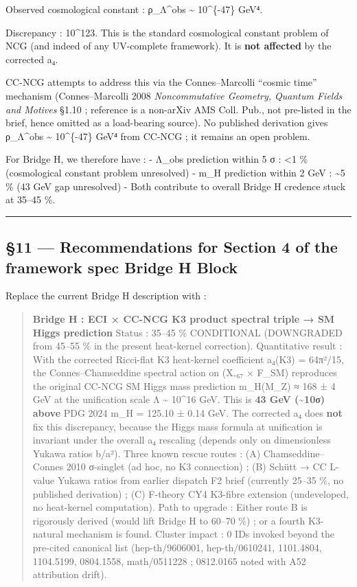 \documentclass[
  11pt,
  a4paper,
]{article}
\begin{document}
Observed cosmological constant : ρ\_Λ\^{}obs \textasciitilde{} 10\^{}\{-47\} GeV⁴.

Discrepancy : 10\^{}123. This is the standard cosmological constant problem of NCG (and indeed of any UV-complete framework). It is \textbf{not affected} by the corrected a₄.

CC-NCG attempts to address this via the Connes--Marcolli ``cosmic time'' mechanism (Connes--Marcolli 2008 \emph{Noncommutative Geometry, Quantum Fields and Motives} §1.10 ; reference is a non-arXiv AMS Coll. Pub., not pre-listed in the brief, hence omitted as a load-bearing source). No published derivation gives ρ\_Λ\^{}obs \textasciitilde{} 10\^{}\{-47\} GeV⁴ from CC-NCG ; it remains an open problem.

For Bridge H, we therefore have :
- Λ\_obs prediction within 5 σ : \textless1 \% (cosmological constant problem unresolved)
- m\_H prediction within 2 GeV : \textasciitilde5 \% (43 GeV gap unresolved)
- Both contribute to overall Bridge H credence stuck at 35--45 \%.

\begin{center}\rule{0.5\linewidth}{0.5pt}\end{center}

\hypertarget{recommendations-for-eci-v14-4-bridge-h-block}{%
\subsection{§11 --- Recommendations for Section 4 of the framework spec Bridge H Block}\label{recommendations-for-eci-v14-4-bridge-h-block}}

Replace the current Bridge H description with :

\begin{quote}
\textbf{Bridge H : ECI × CC-NCG K3 product spectral triple → SM Higgs prediction}
Status : 35--45 \% CONDITIONAL (DOWNGRADED from 45--55 \% in the present heat-kernel correction).
Quantitative result : With the corrected Ricci-flat K3 heat-kernel coefficient a₄(K3) = 64π²/15, the Connes--Chamseddine spectral action on (X₋₆₇ × F\_SM) reproduces the original CC-NCG SM Higgs mass prediction m\_H(M\_Z) ≈ 168 ± 4 GeV at the unification scale Λ \textasciitilde{} 10\^{}16 GeV. This is \textbf{43 GeV (\textasciitilde10σ) above} PDG 2024 m\_H = 125.10 ± 0.14 GeV. The corrected a₄ does \textbf{not} fix this discrepancy, because the Higgs mass formula at unification is invariant under the overall a₄ rescaling (depends only on dimensionless Yukawa ratios b/a²). Three known rescue routes : (A) Chamseddine--Connes 2010 σ-singlet (ad hoc, no K3 connection) ; (B) Schütt → CC L-value Yukawa ratios from earlier dispatch F2 brief (currently 25--35 \%, no published derivation) ; (C) F-theory CY4 K3-fibre extension (undeveloped, no heat-kernel computation).
Path to upgrade : Either route B is rigorously derived (would lift Bridge H to 60--70 \%) ; or a fourth K3-natural mechanism is found.
Cluster impact : 0 IDs invoked beyond the pre-cited canonical list (hep-th/9606001, hep-th/0610241, 1101.4804, 1104.5199, 0804.1558, math/0511228 ; 0812.0165 noted with A52 attribution drift).
\end{quote}
\end{document}
